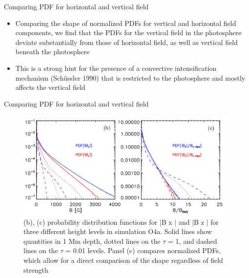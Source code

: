 \documentclass{beamer}
\begin{document}
\begin{frame}{Comparing PDF for horizontal and vertical field}

\begin{itemize}
\item Comparing the shape of normalized
PDFs for vertical and horizontal field components, we find
that the PDFs for the vertical field in the photosphere deviate
substantially from those of horizontal field, as well as vertical
field beneath the photosphere

\item This is a strong
hint for the presence of a convective intensification mechanism
(Schüssler 1990) that is restricted to the photosphere and mostly
affects the vertical field
\end{itemize}
\end{frame}


\begin{frame}{Comparing PDF for horizontal and vertical field}
\begin{figure}[H]
 \centering
 \includegraphics[scale=0.3]{img44-2.png}
	\caption{
(b), (c) probability distribution functions for $\lvert$B x $\rvert$ and $\lvert$B z $\rvert$ for three different height levels in simulation O4a. Solid
lines show quantities in 1 Mm depth, dotted lines on the $\tau$ = 1, and dashed lines on the $\tau$ = 0.01 levels. Panel (c) compares normalized PDFs, which allow for a direct
comparison of the shape regardless of field strength}
\end{figure}

\end{frame}
\end{document}
